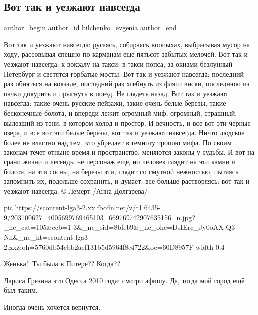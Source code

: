  
 
 
 
 
 
\subsection{Вот так и уезжают навсегда}
\label{sec:24_06_2021.fb.bilchenko_evgenia.6.odessa_2010_vot_tak_i_uezzhajut_navsegda}
\ifcmt
 author_begin
   author_id bilchenko_evgenia
 author_end
\fi

\begin{multicols}{3}
\obeycr
\noindent Вот так и уезжают навсегда:
ругаясь, собираясь впопыхах,
выбрасывая мусор на ходу,
рассовывая спешно по карманам
еще пятьсот забытых мелочей.
\medskip
Вот так и уезжают навсегда:
к вокзалу на такси; в такси попса,
за окнами безлунный Петербург
и светятся горбатые мосты.
\medskip
Вот так и уезжают навсегда:
последний раз обняться на вокзале,
последний раз хлебнуть из фляги виски,
последнюю из пачки докурить
и прыгнуть в поезд. 
Не глядеть назад.
\medskip
Вот так и уезжают навсегда:
такие очень русские пейзажи,
такие очень белые березы,
такие бесконечные болота,
и впереди лежит огромный миф,
огромный, страшный, вылезший из тени,
в котором холод и простор. 
\medskip
И вечность,
и все вот эти черные озера,
и все вот эти белые березы,
вот так и уезжают навсегда.
Ничто людское более не властно
над тем, кто убредает в темноту
тропою мифа. 
По своим законам
течет отныне время и пространство,
меняются законы у судьбы.
И вот на грани жизни и легенды
не персонаж еще, но человек
глядит на эти камни и болота,
на эти сосны, на березы эти,
глядит со смутной нежностью, пытаясь
запомнить их, подольше сохранить,
и думает, все больше растворяясь:
вот так и уезжают навсегда.
© Лемерт /Анна Долгарева/
\restorecr
\end{multicols}

\ifcmt
  pic https://scontent-lga3-2.xx.fbcdn.net/v/t1.6435-9/203100627_4005699769465103_669769742907635156_n.jpg?_nc_cat=105&ccb=1-3&_nc_sid=8bfeb9&_nc_ohc=DsIErc_Jy0oAX-Q3-Nh&_nc_ht=scontent-lga3-2.xx&oh=5760db54cbb2aef131b5d5964f8c4722&oe=60D8957F
	width 0.4
\fi

\begin{itemize}
Женька!! Ты была в Питере?? Когда??

Лариса Грезина это Одесса 2010 года: смотри афишу. Да, тогда мой город ещё был таким.

Иногда очень хочется вернутся.
\end{itemize}
